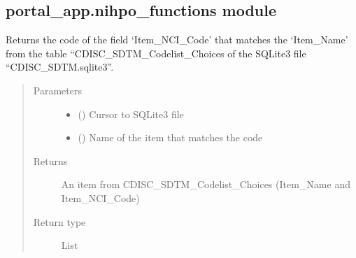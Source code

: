 \documentclass[letterpaper,10pt,english]{sphinxmanual}
\begin{document}
\subsection{portal\_app.nihpo\_functions module}
\label{\detokenize{CE_app:module-CE_app.nihpo_functions}}\label{\detokenize{CE_app:portal-app-nihpo-functions-module}}

\begin{fulllineitems}
\label{\detokenize{CE_app:CE_app.nihpo_functions.func_nihpo_check_code}}
\sphinxAtStartPar
Returns the code of the field ‘Item\_NCI\_Code’ that matches the ‘Item\_Name’ from the table “CDISC\_SDTM\_Codelist\_Choices of the SQLite3 file “CDISC\_SDTM.sqlite3”.
\begin{quote}\begin{description}
\item[{Parameters}] \leavevmode\begin{itemize}
\item {} 
\sphinxAtStartPar
{} () \textendash{} Cursor to SQLite3 file

\item {} 
\sphinxAtStartPar
{} () \textendash{} Name of the item that matches the code

\end{itemize}

\item[{Returns}] \leavevmode
\sphinxAtStartPar
An item from CDISC\_SDTM\_Codelist\_Choices (Item\_Name and Item\_NCI\_Code)

\item[{Return type}] \leavevmode
\sphinxAtStartPar
List

\end{description}\end{quote}

\end{fulllineitems}
\end{document}
